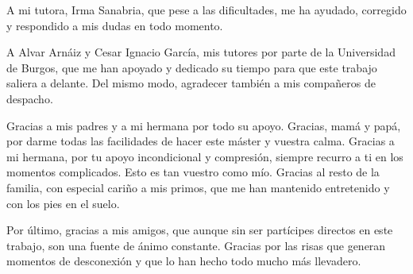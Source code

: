 
\cleardoublepage

\vspace{15ex}


A mi tutora, Irma Sanabria, que pese a las dificultades, me ha ayudado, corregido y respondido a mis dudas en todo momento.

A Alvar Arnáiz y Cesar Ignacio García, mis tutores por parte de la Universidad de Burgos, que me han apoyado y dedicado su tiempo para que este trabajo saliera a delante. Del mismo modo, agradecer también a mis compañeros de despacho.
\medskip

Gracias a mis padres y a mi hermana por todo su apoyo. Gracias, mamá y papá, por darme todas las facilidades de hacer este máster y vuestra calma. Gracias a mi hermana, por tu apoyo incondicional y compresión, siempre recurro a ti en los momentos complicados. Esto es tan vuestro como mío. Gracias al resto de la familia, con especial cariño a mis primos, que me han mantenido entretenido y con los pies en el suelo.
\medskip

Por último, gracias a mis amigos, que aunque sin ser partícipes directos en este trabajo, son una fuente de ánimo constante. Gracias por las risas que generan momentos de desconexión y que lo han hecho todo mucho más llevadero.
